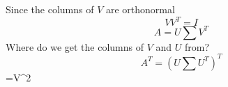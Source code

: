 \markdownRendererInterblockSeparator
{}Since the columns of $V$ are orthonormal\markdownRendererEllipsis{}\markdownRendererInterblockSeparator
{}$$VV^T=I$$\markdownRendererInterblockSeparator
{}$$A = U\sum V^T$$\markdownRendererInterblockSeparator
{}Where do we get the columns of $V$ and $U$ from?\markdownRendererInterblockSeparator
{}$$A^T = (U\sum U^T)^T$$\markdownRendererInterblockSeparator
{}$$=V\sum^2\relax